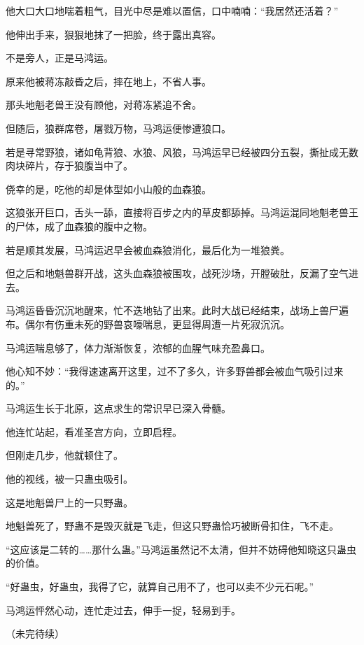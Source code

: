 \begin{this_body}
他大口大口地喘着粗气，目光中尽是难以置信，口中喃喃：“我居然还活着？”

他伸出手来，狠狠地抹了一把脸，终于露出真容。

不是旁人，正是马鸿运。

原来他被蒋冻敲昏之后，摔在地上，不省人事。

那头地魁老兽王没有顾他，对蒋冻紧追不舍。

但随后，狼群席卷，屠戮万物，马鸿运便惨遭狼口。

若是寻常野狼，诸如龟背狼、水狼、风狼，马鸿运早已经被四分五裂，撕扯成无数肉块碎片，存于狼腹当中了。

侥幸的是，吃他的却是体型如小山般的血森狼。

这狼张开巨口，舌头一舔，直接将百步之内的草皮都舔掉。马鸿运混同地魁老兽王的尸体，成了血森狼的腹中之物。

若是顺其发展，马鸿运迟早会被血森狼消化，最后化为一堆狼粪。

但之后和地魁兽群开战，这头血森狼被围攻，战死沙场，开膛破肚，反漏了空气进去。

马鸿运昏昏沉沉地醒来，忙不迭地钻了出来。此时大战已经结束，战场上兽尸遍布。偶尔有伤重未死的野兽哀嚎喘息，更显得周遭一片死寂沉沉。

马鸿运喘息够了，体力渐渐恢复，浓郁的血腥气味充盈鼻口。

他心知不妙：“我得速速离开这里，过不了多久，许多野兽都会被血气吸引过来的。”

马鸿运生长于北原，这点求生的常识早已深入骨髓。

他连忙站起，看准圣宫方向，立即启程。

但刚走几步，他就顿住了。

他的视线，被一只蛊虫吸引。

这是地魁兽尸上的一只野蛊。

地魁兽死了，野蛊不是毁灭就是飞走，但这只野蛊恰巧被断骨扣住，飞不走。

“这应该是二转的……那什么蛊。”马鸿运虽然记不太清，但并不妨碍他知晓这只蛊虫的价值。

“好蛊虫，好蛊虫，我得了它，就算自己用不了，也可以卖不少元石呢。”

马鸿运怦然心动，连忙走过去，伸手一捉，轻易到手。

（未完待续）

\end{this_body}

